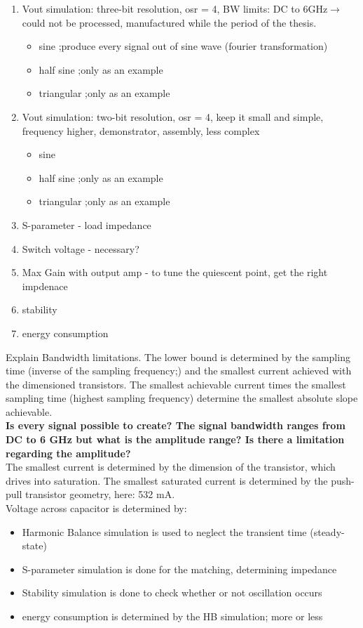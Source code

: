 \begin{enumerate}
	\item Vout simulation: three-bit resolution, osr = 4, BW limits: DC to 6GHz$\rightarrow$ could not be processed, manufactured while the period of the thesis. 
	\begin{itemize}
		\item sine ;produce every signal out of sine wave (fourier transformation)
		\item half sine ;only as an example
		\item triangular ;only as an example
	\end{itemize}
	\item Vout simulation: two-bit resolution, osr = 4, keep it small and simple, frequency higher, demonstrator, assembly, less complex
	\begin{itemize}
		\item sine
		\item half sine ;only as an example
		\item triangular ;only as an example
	\end{itemize}
	\item S-parameter - load impedance		
	\item Switch voltage - necessary?
	\item Max Gain with output amp - to tune the quiescent point, get the right impdenace
	\item stability 
	\item energy consumption
\end{enumerate}
Explain Bandwidth limitations. The lower bound is determined by the sampling time (inverse of the sampling frequency;) and the smallest current achieved with the dimensioned transistors. The smallest achievable current times the smallest sampling time (highest sampling frequency) determine the smallest absolute slope achievable. \\ \textbf{Is every signal possible to create? The signal bandwidth ranges from DC to 6 GHz but what is the amplitude range? Is there a limitation regarding the amplitude?}
\\
The smallest current is determined by the dimension of the transistor, which drives into saturation. The smallest saturated current is determined by the push-pull transistor geometry, here: 532 mA.\\Voltage across capacitor is determined by:

\begin{itemize}
	\item Harmonic Balance simulation is used to neglect the transient time (steady-state)
	\item S-parameter simulation is done for the matching, determining impedance
	\item Stability simulation is done to check whether or not oscillation occurs
	\item energy consumption is determined by the HB simulation; more or less
\end{itemize}

